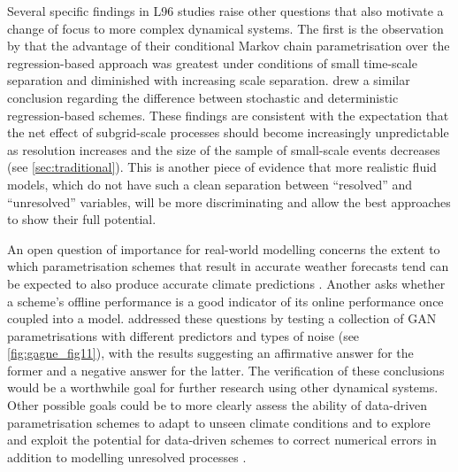 \documentclass[titlepage,twoside]{article}
\numberwithin{equation}{section}
\begin{document}
Several specific findings in L96 studies raise other questions that also
motivate a change of focus to more complex dynamical systems. The first is the
observation by \textcite{crommelin2008} that the advantage of their conditional
Markov chain parametrisation over the regression-based approach was greatest
under conditions of small time-scale separation and diminished with increasing
scale separation. \textcite{arnold2013} drew a similar conclusion regarding the
difference between stochastic and deterministic regression-based schemes. These
findings are consistent with the expectation that the net effect of
subgrid-scale processes should become increasingly unpredictable as resolution
increases and the size of the sample of small-scale events decreases (see
\cref{sec:traditional}). This is another piece of evidence that more realistic
fluid models, which do not have such a clean separation between ``resolved''
and ``unresolved'' variables, will be more discriminating and allow the best
approaches to show their full potential.

An open question of importance for real-world modelling concerns the extent to
which parametrisation schemes that result in accurate weather forecasts tend
can be expected to also produce accurate climate predictions
\parencite{christensen2019}. Another asks whether a scheme's offline
performance is a good indicator of its online performance once coupled into a
model. \textcite{gagne2020} addressed these questions by testing a collection
of GAN parametrisations with different predictors and types of noise (see
\cref{fig:gagne_fig11}), with the results suggesting an affirmative answer for
the former and a negative answer for the latter. The verification of these
conclusions would be a worthwhile goal for further research using other
dynamical systems. Other possible goals could be to more clearly assess
the ability of data-driven parametrisation schemes to adapt to unseen climate
conditions \parencite{christensen2015} and to explore and exploit the potential
for data-driven schemes to correct numerical errors in addition to modelling
unresolved processes \parencite{bhouri2023}.
\end{document}
